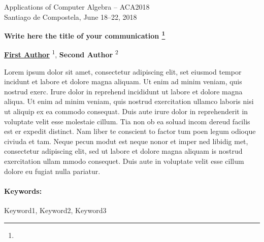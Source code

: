 \documentclass{article}
\makeatletter
\newcommand{\TITLE}[2][]{
  \begin{center} \Large \bfseries #2%
  \def\@temp{#1}\ifx\@temp\@empty\relax\else\footnote{#1}\fi\end{center}}
\newcommand{\AUTHOR}[2][]{\textbf{#2}%
  \def\@temp{#1}\ifx\@temp\@empty\relax\else\textsuperscript{#1}\fi}
\newcommand{\KEYWORDS}[1]{\paragraph{Keywords:} #1}
\newcommand{\HEADING}{
{\noindent \small Applications of Computer Algebra -- ACA2018 \\
Santiago de Compostela, June 18--22, 2018} \vspace{10pt}}
\makeatother
\begin{document}
\HEADING


\TITLE{Write here the title of your communication}




\begin{center}
 \AUTHOR[1]{\underline{First Author}}, %
 \AUTHOR[2]{Second Author}
\end{center}



Lorem ipsum dolor sit amet, consectetur adipiscing elit, set eiusmod tempor incidunt et labore et dolore magna aliquam. Ut enim ad minim veniam, quis nostrud exerc. Irure dolor in reprehend incididunt ut labore et dolore magna aliqua. Ut enim ad minim veniam, quis nostrud exercitation ullamco laboris nisi ut aliquip ex ea commodo consequat. Duis aute irure dolor in reprehenderit in voluptate velit esse molestaie cillum. Tia non ob ea soluad incom dereud facilis est er expedit distinct. Nam liber te conscient to factor tum poen legum odioque civiuda et tam. Neque pecun modut est neque nonor et imper ned libidig met, consectetur adipiscing elit, sed ut labore et dolore magna aliquam is nostrud exercitation ullam mmodo consequet. Duis aute in voluptate velit esse cillum dolore eu fugiat nulla pariatur. 



\KEYWORDS {Keyword1, Keyword2, Keyword3}





\end{document}
